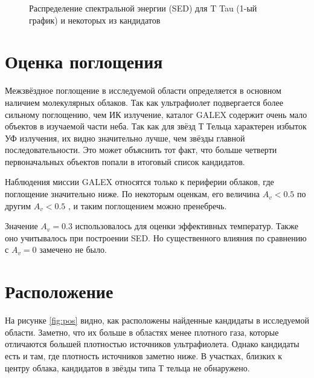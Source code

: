 \begin{figure}[ht]
\begin{minipage}[ht]{0.49\linewidth}
\end{minipage}
\hfill
\begin{minipage}[ht]{0.49\linewidth}
\end{minipage}
\begin{minipage}[ht]{0.49\linewidth}
\end{minipage}
\hfill
\begin{minipage}[ht]{0.49\linewidth}
\end{minipage}
\caption{Распределение спектральной энергии (SED) для T Tau (1-ый график) и некоторых из кандидатов}
\label{fig:sed}
\end{figure}

\section{Оценка поглощения}

Межзвёздное поглощение в исследуемой области определяется в основном наличием молекулярных облаков.
Так как ультрафиолет подвергается более сильному поглощению, чем ИК излучение, каталог GALEX содержит очень мало объектов в изучаемой части неба. Так как для звёзд Т Тельца характерен избыток УФ излучения, их видно значительно лучше, чем звёзды главной последовательности. Это может объяснить тот факт, что больше четверти первоначальных объектов попали в итоговый список кандидатов.

Наблюдения миссии GALEX относятся только к периферии облаков, где поглощение значительно ниже. По некоторым оценкам, его величина $A_v < 0.5$ \cite{AIGdC2014galex} по другим $A_v < 0.5$ \cite{park2012far}, и таким поглощением можно пренебречь.

Значение $A_v = 0.3$ использовалось для оценки эффективных температур. Также оно учитывалось при построении SED. Но существенного влияния по сравнению с $A_v = 0$ замечено не было.

\section{Расположение}
На рисунке \ref{fig:pos} видно, как расположены найденные кандидаты в исследуемой области. Заметно, что их больше в областях менее плотного газа, которые отличаются большей плотностью источников ультрафиолета. Однако кандидаты есть и там, где плотность источников заметно ниже. В участках, близких к центру облака, кандидатов в звёзды типа Т тельца не обнаружено.

